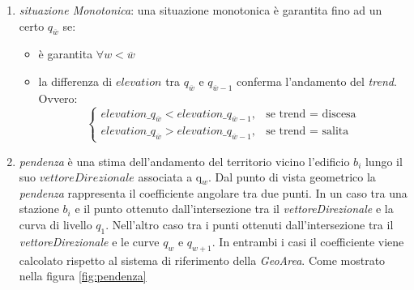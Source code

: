 \begin{enumerate}
\item \textit{situazione Monotonica}: una situazione monotonica è garantita fino ad un certo $q_{\overline{w}}$ se:
\begin{itemize}
\item è garantita $\forall w<\overline{w}$ 
\item la differenza di $elevation$ tra $q_{\overline{w}}$ e $q_{\overline{w}-1}$ conferma l'andamento del \textit{trend}. Ovvero:
\begin{equation}
\label{monotonica}
\begin{cases}
               elevation\_q_{\overline{w}} < elevation\_q_{\overline{w}-1},  & \text{se trend = discesa}\\
               elevation\_q_{\overline{w}} > elevation\_q_{\overline{w}-1}, & \text{se trend = salita}
            \end{cases} 
\end{equation}
\end{itemize} 


\item \textit{pendenza} è una stima dell'andamento del territorio vicino l'edificio $b_i$ lungo il suo $vettoreDirezionale$ associata a q$_w$. Dal punto di vista geometrico la \textit{pendenza} rappresenta il coefficiente angolare tra due punti. In un caso tra una stazione $b_i$ e il punto ottenuto dall'intersezione tra il \textit{vettoreDirezionale} e la curva di livello $q_1$. Nell'altro caso tra i punti ottenuti dall'intersezione tra il \textit{vettoreDirezionale} e le curve $q_w$ e $q_{w+1}$. In entrambi i casi il coefficiente viene calcolato rispetto al sistema di riferimento della \textit{GeoArea}.
Come mostrato nella figura  \ref{fig:pendenza}


\end{enumerate}
